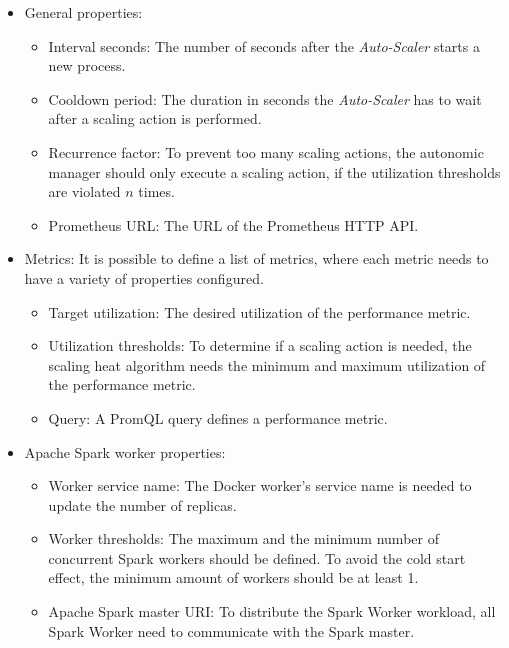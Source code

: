\begin{itemize}
\item General properties:
\begin{itemize}
\item Interval seconds: The number of seconds after the \textit{Auto-Scaler} starts a new process.

\item Cooldown period: The duration in seconds the \textit{Auto-Scaler} has to wait after a scaling action is performed.

\item Recurrence factor: To prevent too many scaling actions,  the autonomic manager should only execute a scaling action,  if the utilization thresholds are violated $n$ times.

\item Prometheus URL: The URL of the Prometheus HTTP API.
\end{itemize}

\item Metrics:
It is possible to define a list of metrics, where each metric needs to have a variety of properties configured.
\begin{itemize}
\item Target utilization: The desired utilization of the performance metric.

\item Utilization thresholds: To determine if a scaling action is needed, the scaling heat algorithm needs the minimum and maximum utilization of the performance metric.

\item Query: A PromQL query defines a performance metric.
\end{itemize}

\item Apache Spark worker properties:
\begin{itemize}
\item Worker service name: The Docker worker's service name is needed to update the number of replicas.

\item Worker thresholds: The maximum and the minimum number of concurrent Spark workers should be defined. To avoid the cold start effect, the minimum amount of workers should be at least 1. 

\item Apache Spark master URI: To distribute the Spark Worker workload, all Spark Worker need to communicate with the Spark master.
\end{itemize}
\end{itemize}


